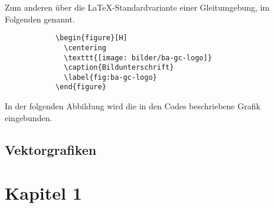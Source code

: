        Zum anderen über die \LaTeX-Standardvariante einer Gleitumgebung, im Folgenden  genannt.

        \begin{code}[H]
          \begin{verbatim}
            \begin{figure}[H]
              \centering 
              \texttt{[image: bilder/ba-gc-logo]}
              \caption{Bildunterschrift}
              \label{fig:ba-gc-logo}
            \end{figure}
          \end{verbatim}
          \caption{Grafiken mittels Environments einfügen}
          \label{code:bild-einfuegen2}
        \end{code}

        In der folgenden Abbildung wird die in den Codes beschriebene Grafik eingebunden.

  \subsection{Vektorgrafiken}
    \label{sec:vectorgrafiken}

\section{Kapitel 1}
  \blindtext

